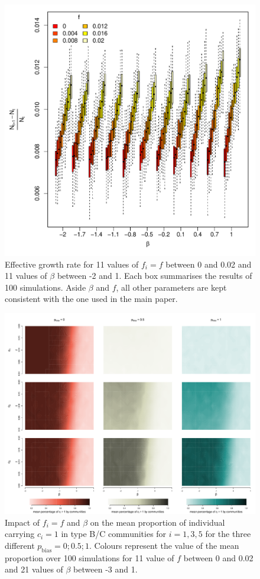 \documentclass[9pt,twoside,lineno]{pnas-new}
\begin{document}
\begin{figure}  %
    \centering
    \includegraphics[width=.7\textwidth]{FigsSM/GrowthVsBetaAndF.pdf}
    \caption{Effective growth rate for 11 values of $f_i=f$ between 0 and 0.02 and 11 values of $\beta$ between -2 and 1. Each box summarises the results of 100 simulations. Aside $\beta$ and $f$, all other parameters are kept consistent with the one used in the main paper.     }
    \label{fig:fbeta-growth-rate}
\end{figure}



\begin{figure} %
    \includegraphics[width=.8\textwidth]{FigsSM/FBETA_heatmap_3PW_3pbias.pdf} 

    \caption{Impact of $f_i=f$ and $\beta$ on the mean proportion of individual carrying $c_i=1$ in type B/C communities for $i=1,3,5$ for the three different $p_\text{bias}=0;0.5;1$. Colours represent the value of the mean proportion over 100 simulations for 11 value of $f$ between 0 and 0.02 and 21 values of $\beta$ between -3 and 1.}
    \label{fig:betaexplor}
\end{figure}
\end{document}
